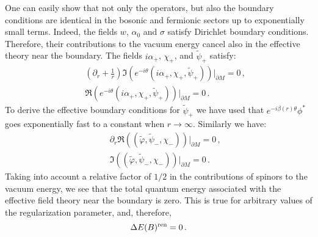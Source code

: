 \documentclass[a4paper,12pt]{article}
\begin{document}
One can easily show that not only the operators, but also the
boundary conditions are identical in the bosonic and fermionic 
sectors up to exponentially small terms. Indeed, the fields
$w$, $\alpha_0$ and $\sigma$ satisfy Dirichlet boundary conditions.
Therefore, their contributions to the vacuum energy cancel
also in the effective theory near the boundary. 
The fields $i\alpha_+$, $\chi_+$, and $\tilde\psi_+$ satisfy:
\begin{eqnarray}
&&\left( \partial_r +\frac 1r \right) \Im 
\left( e^{-i\theta} (i\alpha_+,\chi_+,\tilde\psi_+) \right) 
\vert_{\partial M}=
0\,,\nonumber\\
&&\Re \left( e^{-i\theta} (i\alpha_+,\chi_+,\tilde\psi_+) \right) 
\vert_{\partial M}=0\,.\label{effbc1}
\end{eqnarray}
To derive the effective boundary conditions for $\tilde\psi_+$ we have
used that $e^{-i\beta(r)\theta}\phi^*$ goes exponentially fast
to a constant when $r\to\infty$. Similarly we have:
\begin{eqnarray}
&&\partial_r \Re \left( (\tilde\varphi,\tilde\psi_-,\chi_-) \right)
\vert_{\partial M}=
0\,,\nonumber\\
&&\Im \left( (\tilde\varphi,\tilde\psi_-,\chi_-) \right)
\vert_{\partial M}=0 \,.\label{effbc2}
\end{eqnarray}
Taking into account a relative
factor of $1/2$ in the contributions of spinors to the vacuum
energy, we see that the total quantum energy associated with the
effective field theory near the boundary is zero. This is true for
arbitrary values of the regularization parameter, and, therefore,
\begin{equation}
\Delta E (B)^{\rm ren}=0 \,.\label{DEBren}
\end{equation}

\end{document}
